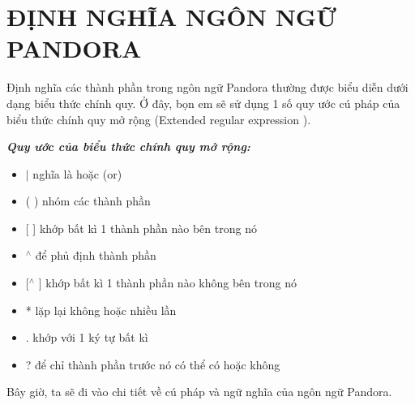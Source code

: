 \chapter{\bf{ĐỊNH NGHĨA NGÔN NGỮ PANDORA}}

Định nghĩa các thành phần trong ngôn ngữ Pandora thường được biểu diễn dưới dạng biểu thức chính quy\cite{li2008regular}. Ở đây, bọn em sẽ sử dụng 1 số quy ước cú pháp của biểu thức chính quy mở rộng (Extended regular expression \cite{freydenberger2013extended}).

\textbf{\textit{Quy ước của biểu thức chính quy mở rộng:}}

\begin{itemize}
    \item{$|$ nghĩa là hoặc (or)}
    \item{( ) nhóm các thành phần}
    \item{[ ] khớp bất kì 1 thành phần nào bên trong nó}
    \item{$^\wedge$ để phủ định thành phần}
    \item{[$^\wedge$ ] khớp bất kì 1 thành phần nào không bên trong nó}
    \item{* lặp lại không hoặc nhiều lần}
    \item{. khớp với 1 ký tự bất kì}
    \item{? để chỉ thành phần trước nó có thể có hoặc không}
\end{itemize}

Bây giờ, ta sẽ đi vào chi tiết về cú pháp và ngữ nghĩa của ngôn ngữ Pandora.






